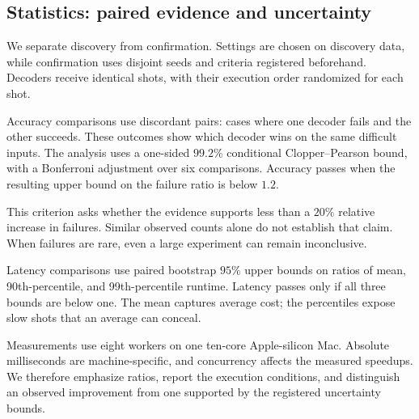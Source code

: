 \subsection{Statistics: paired evidence and uncertainty}

We separate discovery from confirmation. Settings are chosen on discovery data, while confirmation uses disjoint seeds and criteria registered beforehand. Decoders receive identical shots, with their execution order randomized for each shot.

Accuracy comparisons use discordant pairs: cases where one decoder fails and the other succeeds. These outcomes show which decoder wins on the same difficult inputs. The analysis uses a one-sided $99.2\%$ conditional Clopper--Pearson bound, with a Bonferroni adjustment over six comparisons. Accuracy passes when the resulting upper bound on the failure ratio is below $1.2$.

This criterion asks whether the evidence supports less than a $20\%$ relative increase in failures. Similar observed counts alone do not establish that claim. When failures are rare, even a large experiment can remain inconclusive.

Latency comparisons use paired bootstrap $95\%$ upper bounds on ratios of mean, 90th-percentile, and 99th-percentile runtime. Latency passes only if all three bounds are below one. The mean captures average cost; the percentiles expose slow shots that an average can conceal.

Measurements use eight workers on one ten-core Apple-silicon Mac. Absolute milliseconds are machine-specific, and concurrency affects the measured speedups. We therefore emphasize ratios, report the execution conditions, and distinguish an observed improvement from one supported by the registered uncertainty bounds.

